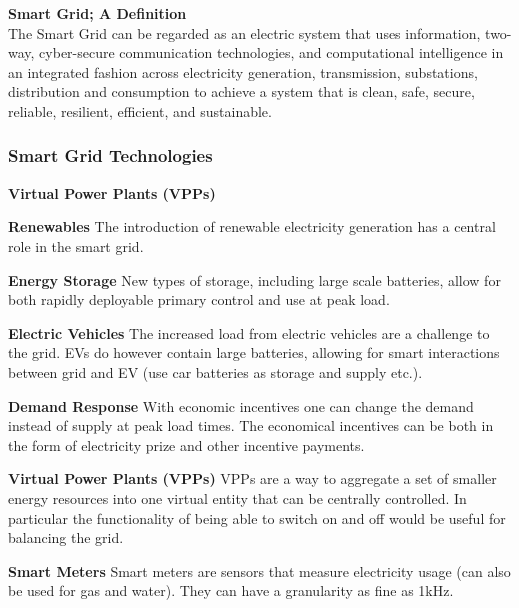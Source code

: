 \begin{tcolorbox}
\textbf{Smart Grid; A Definition}\\
The Smart Grid can be regarded as an electric system
that uses information, two-way, cyber-secure
communication technologies, and computational
intelligence in an integrated fashion across electricity
generation, transmission, substations, distribution and
consumption to achieve a system that is clean, safe,
secure, reliable, resilient, efficient, and sustainable.
\end{tcolorbox}

\subsubsection{Smart Grid Technologies}
\begin{labeling}{\textbf{Virtual Power Plants (VPPs)}}
    \item [\textbf{Renewables}]
    The introduction of renewable electricity generation has a central role in the smart grid.

    \item [\textbf{Energy Storage}]
    New types of storage, including large scale batteries, allow for both rapidly deployable primary control and use at peak load.

    \item [\textbf{Electric Vehicles}]
    The increased load from electric vehicles are a challenge to the grid.
    EVs do however contain large batteries, allowing for smart interactions between grid and EV (use car batteries as storage and supply etc.).

    \item [\textbf{Demand Response}]
    With economic incentives one can change the demand instead of supply at peak load times.
    The economical incentives can be both in the form of electricity prize and other incentive payments.

    \item [\textbf{Virtual Power Plants (VPPs)}]
    VPPs are a way to aggregate a set of smaller energy resources into one virtual entity that can be centrally controlled.
    In particular the functionality of being able to switch on and off would be useful for balancing the grid.

    \item [\textbf{Smart Meters}]
    Smart meters are sensors that measure electricity usage (can also be used for gas and water). They can have a granularity as fine as 1kHz.



\end{labeling}
